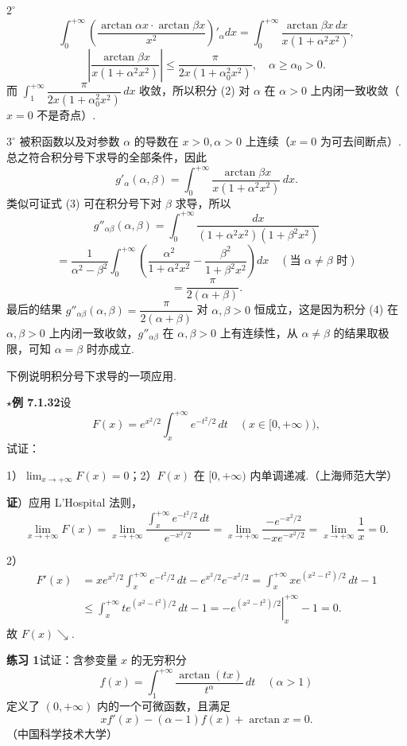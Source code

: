 \documentclass[UTF8, 12pt, fontset=fandol, oneside]{ctexart}
\begin{document}
$2^\circ$
\[
\int_0^{+\infty}\left(\frac{\arctan\alpha x\cdot\arctan\beta x}{x^2}\right)'_\alpha dx
=\int_0^{+\infty}\frac{\arctan\beta x\,dx}{x(1+\alpha^2x^2)},
\tag{2}
\]
\[
\left|\frac{\arctan\beta x}{x(1+\alpha^2x^2)}\right|
\le\frac{\pi}{2x(1+\alpha_0^2x^2)},\quad \alpha\ge\alpha_0>0.
\]
而 $\displaystyle\int_1^{+\infty}\dfrac{\pi}{2x(1+\alpha_0^2x^2)}\,dx$ 收敛，所以积分 (2) 对 $\alpha$ 在 $\alpha>0$ 上内闭一致收敛（$x=0$ 不是奇点）.

$3^\circ$ 被积函数以及对参数 $\alpha$ 的导数在 $x>0,\alpha>0$ 上连续（$x=0$ 为可去间断点）. 总之符合积分号下求导的全部条件，因此
\[
g'_\alpha(\alpha,\beta)=\int_0^{+\infty}\frac{\arctan\beta x}{x(1+\alpha^2x^2)}\,dx.
\tag{3}
\]
类似可证式 (3) 可在积分号下对 $\beta$ 求导，所以
\[
g''_{\alpha\beta}(\alpha,\beta)
=\int_0^{+\infty}\frac{dx}{(1+\alpha^2x^2)(1+\beta^2x^2)}
\tag{4}
\]
\[
=\frac1{\alpha^2-\beta^2}\int_0^{+\infty}\left(\frac{\alpha^2}{1+\alpha^2x^2}-\frac{\beta^2}{1+\beta^2x^2}\right)dx\quad(\text{当 }\alpha\ne\beta\text{ 时})
\]
\[
=\frac{\pi}{2(\alpha+\beta)}.
\]
最后的结果 $g''_{\alpha\beta}(\alpha,\beta)=\dfrac{\pi}{2(\alpha+\beta)}$ 对 $\alpha,\beta>0$ 恒成立，这是因为积分 (4) 在 $\alpha,\beta>0$ 上内闭一致收敛，$g''_{\alpha\beta}$ 在 $\alpha,\beta>0$ 上有连续性，从 $\alpha\ne\beta$ 的结果取极限，可知 $\alpha=\beta$ 时亦成立.

下例说明积分号下求导的一项应用.

\noindent\textbf{$\star$例 7.1.32}\quad 设
\[
F(x)=e^{x^2/2}\int_x^{+\infty}e^{-t^2/2}\,dt\quad(x\in[0,+\infty)),
\]
试证：

1）$\displaystyle\lim_{x\to+\infty}F(x)=0$；2）$F(x)$ 在 $[0,+\infty)$ 内单调递减.（上海师范大学）

\noindent\textbf{证}）应用 L'Hospital 法则，
\[
\lim_{x\to+\infty}F(x)=\lim_{x\to+\infty}\frac{\displaystyle\int_x^{+\infty}e^{-t^2/2}\,dt}{e^{-x^2/2}}
=\lim_{x\to+\infty}\frac{-e^{-x^2/2}}{-xe^{-x^2/2}}
=\lim_{x\to+\infty}\frac1x=0.
\]

2）
\[
\begin{aligned}
F'(x)
&=xe^{x^2/2}\int_x^{+\infty}e^{-t^2/2}\,dt-e^{x^2/2}e^{-x^2/2}
=\int_x^{+\infty}xe^{(x^2-t^2)/2}\,dt-1\\
&\le\int_x^{+\infty}te^{(x^2-t^2)/2}\,dt-1
=-\left.e^{(x^2-t^2)/2}\right|_x^{+\infty}-1=0.
\end{aligned}
\]
故 $F(x)\searrow$.

\noindent\textbf{练习 1}\quad 试证：含参变量 $x$ 的无穷积分
\[
f(x)=\int_1^{+\infty}\frac{\arctan(tx)}{t^\alpha}\,dt\quad(\alpha>1)
\tag{1}
\]
定义了 $(0,+\infty)$ 内的一个可微函数，且满足
\[
xf'(x)-(\alpha-1)f(x)+\arctan x=0.
\tag{2}
\]
（中国科学技术大学）
\end{document}
